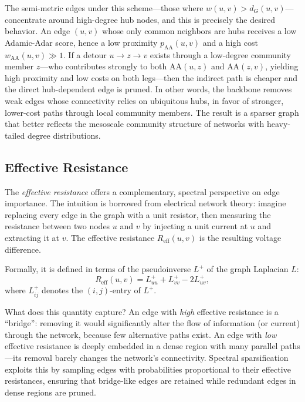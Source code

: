 \documentclass[conference]{IEEEtran}
\begin{document}
The semi-metric edges under this scheme---those where $w(u,v) > d_G(u,v)$---concentrate around high-degree hub nodes, and this is precisely the desired behavior. An edge $(u,v)$ whose only common neighbors are hubs receives a low Adamic-Adar score, hence a low proximity $p_{\text{AA}}(u,v)$ and a high cost $w_{\text{AA}}(u,v) \gg 1$. If a detour $u \to z \to v$ exists through a low-degree community member $z$---who contributes strongly to both $\text{AA}(u,z)$ and $\text{AA}(z,v)$, yielding high proximity and low costs on both legs---then the indirect path is cheaper and the direct hub-dependent edge is pruned. In other words, the backbone removes weak edges whose connectivity relies on ubiquitous hubs, in favor of stronger, lower-cost paths through local community members. The result is a sparser graph that better reflects the mesoscale community structure of networks with heavy-tailed degree distributions.

\subsection{Effective Resistance}

The \emph{effective resistance} offers a complementary, spectral perspective on edge importance. The intuition is borrowed from electrical network theory: imagine replacing every edge in the graph with a unit resistor, then measuring the resistance between two nodes $u$ and $v$ by injecting a unit current at $u$ and extracting it at $v$. The effective resistance $R_{\text{eff}}(u,v)$ is the resulting voltage difference.

Formally, it is defined in terms of the pseudoinverse $L^+$ of the graph Laplacian $L$:
\begin{equation}
    R_{\text{eff}}(u, v) = L^+_{uu} + L^+_{vv} - 2L^+_{uv},
    \label{eq:effective_resistance}
\end{equation}
where $L^+_{ij}$ denotes the $(i,j)$-entry of $L^+$.

What does this quantity capture? An edge with \emph{high} effective resistance is a ``bridge'': removing it would significantly alter the flow of information (or current) through the network, because few alternative paths exist. An edge with \emph{low} effective resistance is deeply embedded in a dense region with many parallel paths---its removal barely changes the network's connectivity. Spectral sparsification exploits this by sampling edges with probabilities proportional to their effective resistances, ensuring that bridge-like edges are retained while redundant edges in dense regions are pruned.
\end{document}
